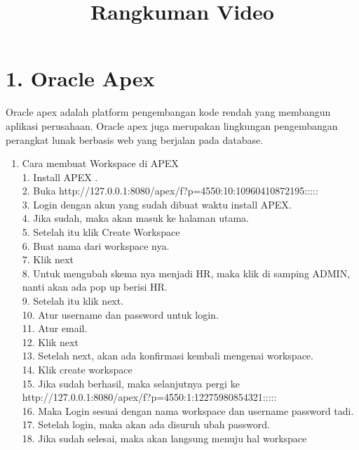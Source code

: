 \clearpage
\setcounter{page}{1}

\begin{center}
\title{\LARGE \bf Rangkuman Video}
\end{center}

\section*{\normalsize 1. Oracle Apex} 
\hspace {\parindent}Oracle apex adalah platform pengembangan kode rendah yang membangun aplikasi perusahaan. Oracle apex juga merupakan lingkungan pengembangan perangkat lunak berbasis web yang berjalan pada database.
\begin{enumerate}[label=\alph*.]
\item Cara membuat Workspace di APEX\\
1. Install APEX .\\
2. Buka http://127.0.0.1:8080/apex/f?p=4550:10:10960410872195:::::\\
3. Login dengan akun yang sudah dibuat waktu install APEX.\\
4. Jika sudah, maka akan masuk ke halaman utama.\\
5. Setelah itu klik Create Workspace\\
6. Buat nama dari workspace nya.\\
7. Klik next\\
8. Untuk mengubah skema nya menjadi HR, maka klik di samping ADMIN, nanti akan ada pop up berisi HR.\\
9. Setelah itu klik next.\\
10. Atur username dan password untuk login.\\
11. Atur email.\\
12. Klik next\\
13. Setelah next, akan ada konﬁrmasi kembali mengenai workspace.\\
14. Klik create workspace\\
15. Jika sudah berhasil, maka selanjutnya pergi ke http://127.0.0.1:8080/apex/f?p=4550:1:12275980854321:::::\\
16. Maka Login sesuai dengan nama workspace dan username password tadi.\\
17. Setelah login, maka akan ada disuruh ubah password.\\
18. Jika sudah selesai, maka akan langsung menuju hal workspace\\
\end{enumerate}


